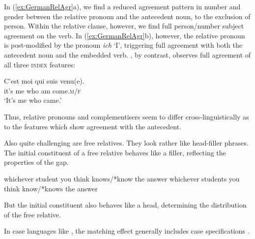 \documentclass[output=paper
,notxmath 
	        ,collection
	        ,collectionchapter
 	        ,biblatex
                ,babelshorthands
                ,newtxmath
                ,draftmode
                ,colorlinks, citecolor=brown
]{langscibook}
\begin{document}
\noindent 
In (\ref{ex:GermanRelAgr}a), we find a reduced agreement pattern in
number and gender between the relative pronoun and the antecedent
noun, to the exclusion of person. Within the relative clause, however, we find full person/number subject agreement on the verb. In (\ref{ex:GermanRelAgr}b), however, the relative pronoun is post-modified by the pronoun \textit{ich} `I', triggering full  agreement with both the antecedent noun and the embedded verb. 
, by contrast, observes full agreement of all three \textsc{index} features: 

\begin{exe}
 \ex \label{ex:FrenchRelSAgr} \gll C'est moi qui suis venu(e).\\
  it's me who am come.\textsc{m/f}\\
\glt `It's me who came.' 
\end{exe}
 
\noindent
Thus, relative pronouns and complementisers seem to differ cross-linguistically as to the features
which show agreement with the antecedent.  

Also quite challenging are free relatives. They look rather like
head-filler phrases. The initial constituent of a free relative behaves
like a filler, reflecting the properties of the gap.

\eal
\ex \label{ex:UDC:63}
whichever student you think knows/*know the answer
\ex \label{ex:UDC:64}
whichever students you think know/*knows the answer
\zl

\noindent
But the initial constituent also behaves like a head, determining the
distribution of the free relative.

\begin{exe}
\ex \label{ex:UDC:65}
\begin{xlist}
  
\end{xlist}
\end{exe}


\begin{exe}
\ex \label{ex:UDC:66}
\begin{xlist}
\end{xlist}
\end{exe}

\noindent
In case languages like , the matching effect generally includes case
specifications \citep{Mueller:99a}. %
\end{document}
